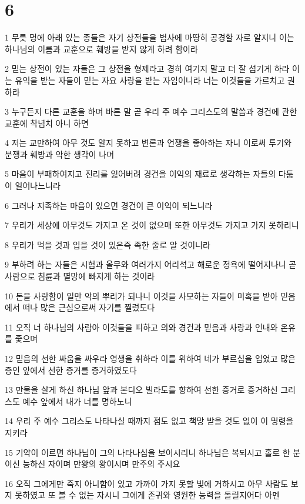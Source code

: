\chapter{6}

\par 1 무릇 멍에 아래 있는 종들은 자기 상전들을 범사에 마땅히 공경할 자로 알지니 이는 하나님의 이름과 교훈으로 훼방을 받지 않게 하려 함이라
\par 2 믿는 상전이 있는 자들은 그 상전을 형제라고 경히 여기지 말고 더 잘 섬기게 하라 이는 유익을 받는 자들이 믿는 자요 사랑을 받는 자임이니라 너는 이것들을 가르치고 권하라
\par 3 누구든지 다른 교훈을 하며 바른 말 곧 우리 주 예수 그리스도의 말씀과 경건에 관한 교훈에 착념치 아니 하면
\par 4 저는 교만하여 아무 것도 알지 못하고 변론과 언쟁을 좋아하는 자니 이로써 투기와 분쟁과 훼방과 악한 생각이 나며
\par 5 마음이 부패하여지고 진리를 잃어버려 경건을 이익의 재료로 생각하는 자들의 다툼이 일어나느니라
\par 6 그러나 지족하는 마음이 있으면 경건이 큰 이익이 되느니라
\par 7 우리가 세상에 아무것도 가지고 온 것이 없으매 또한 아무것도 가지고 가지 못하리니
\par 8 우리가 먹을 것과 입을 것이 있은즉 족한 줄로 알 것이니라
\par 9 부하려 하는 자들은 시험과 올무와 여러가지 어리석고 해로운 정욕에 떨어지나니 곧 사람으로 침륜과 멸망에 빠지게 하는 것이라
\par 10 돈을 사랑함이 일만 악의 뿌리가 되나니 이것을 사모하는 자들이 미혹을 받아 믿음에서 떠나 많은 근심으로써 자기를 찔렀도다
\par 11 오직 너 하나님의 사람아 이것들을 피하고 의와 경건과 믿음과 사랑과 인내와 온유를 좇으며
\par 12 믿음의 선한 싸움을 싸우라 영생을 취하라 이를 위하여 네가 부르심을 입었고 많은 증인 앞에서 선한 증거를 증거하였도다
\par 13 만물을 살게 하신 하나님 앞과 본디오 빌라도를 향하여 선한 증거로 증거하신 그리스도 예수 앞에서 내가 너를 명하노니
\par 14 우리 주 예수 그리스도 나타나실 때까지 점도 없고 책망 받을 것도 없이 이 명령을 지키라
\par 15 기약이 이르면 하나님이 그의 나타나심을 보이시리니 하나님은 복되시고 홀로 한 분이신 능하신 자이며 만왕의 왕이시며 만주의 주시요
\par 16 오직 그에게만 죽지 아니함이 있고 가까이 가지 못할 빛에 거하시고 아무 사람도 보지 못하였고 또 볼 수 없는 자시니 그에게 존귀와 영원한 능력을 돌릴지어다 아멘
